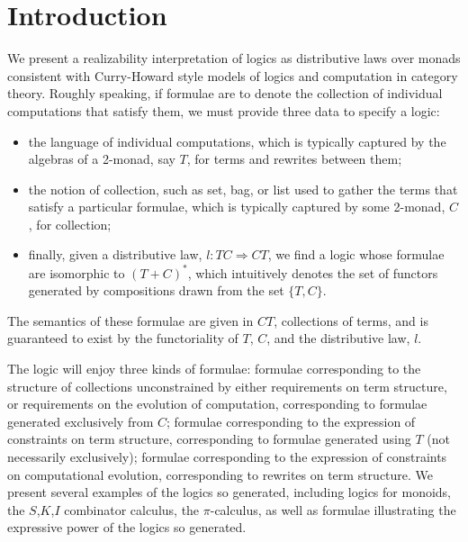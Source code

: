 \documentclass[]{acm_proc_article-sp}
\numberwithin{equation}{subsection}
\newcommand{\pic}{$\pi$-calculus}
\newcommand{\paperversion}{Draft Version 0.1 - Jan 7, 2015}
\newenvironment{toc}
{
\begin{list}{}{
   \setlength{\leftmargin}{0.4in}
   \setlength{\rightmargin}{0.6in}
   \setlength{\parskip}{0pt}
 } \item }
{\end{list}}
\begin{document}



\section{Introduction}

We present a realizability interpretation of logics as distributive
laws over monads consistent with Curry-Howard style models of logics
and computation in category theory. Roughly speaking, if formulae are
to denote the collection of individual computations that satisfy them,
we must provide three data to specify a logic: 

\begin{itemize}
  \item the language of individual computations, which is typically
  captured by the algebras of a 2-monad, say $T$, for terms and
  rewrites between them;
  \item the notion of collection, such as set, bag, or list used to
  gather the terms that satisfy a particular formulae, which is
  typically captured by some 2-monad, $C$, for collection;
  \item finally, given a distributive law, $l : TC \Rightarrow CT$, we
  find a logic whose formulae are isomorphic to $(T+C)^{*}$, which
  intuitively denotes the set of functors generated by compositions
  drawn from the set $\{T,C\}$.
\end{itemize}

The semantics of these formulae are given in $CT$, collections of
terms, and is guaranteed to exist by the functoriality of $T$, $C$,
and the distributive law, $l$.

The logic will enjoy three kinds of formulae: formulae corresponding
to the structure of collections unconstrained by either requirements
on term structure, or requirements on the evolution of computation,
corresponding to formulae generated exclusively from $C$; formulae
corresponding to the expression of constraints on term structure,
corresponding to formulae generated using $T$ (not necessarily
exclusively); formulae corresponding to the expression of constraints
on computational evolution, corresponding to rewrites on term
structure. We present several examples of the logics so generated,
including logics for monoids, the $S$,$K$,$I$ combinator calculus, the
{\pic}, as well as formulae illustrating the expressive power of the
logics so generated.
\end{document}
